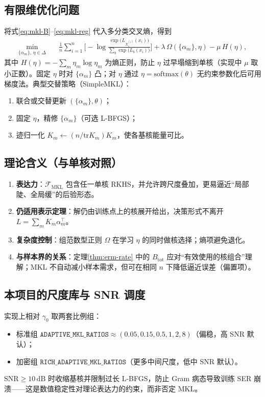 \subsection{有限维优化问题}
将式\eqref{eq:mkl-B}--\eqref{eq:mkl-reg} 代入多分类交叉熵，得到
\begin{equation}
\begin{aligned}
\min_{\{\alpha_m\},\,\eta\in\Delta}
&\quad
\frac1n\sum_{i=1}^n
\Big[
-\log\frac{\exp\big(L_{X_1^{(i)}}(x_i)\big)}{\sum_b\exp\big(L_b(x_i)\big)}
\Big]
+\lambda\,\Omega(\{\alpha_m\},\eta)
-\mu\,H(\eta),
\end{aligned}
\label{eq:mkl-obj}
\end{equation}
其中 $H(\eta)=-\sum_m\eta_m\log\eta_m$ 为熵正则，防止 $\eta$ 过早塌缩到单核（实现中 $\mu$ 取小正数）。固定 $\eta$ 时对 $\{\alpha_m\}$ 凸；对 $\eta$ 通过 $\eta=\mathrm{softmax}(\theta)$ 无约束参数化后可用梯度法。典型交替策略（SimpleMKL）：
\begin{enumerate}[leftmargin=2em]
  \item 联合或交替更新 $(\{\alpha_m\},\theta)$；
  \item 固定 $\eta$，精修 $\{\alpha_m\}$（可选 L-BFGS）；
  \item 迹归一化 $K_m\leftarrow (n/\mathrm{tr}K_m)K_m$，使各基核能量可比。
\end{enumerate}

\subsection{理论含义（与单核对照）}
\begin{enumerate}[leftmargin=2em]
  \item \textbf{表达力}：$\mathcal{F}_{\mathrm{MKL}}$ 包含任一单核 RKHS，并允许跨尺度叠加，更易逼近“局部陡、全局缓”的后验形态。
  \item \textbf{仍适用表示定理}：解仍由训练点上的核展开给出，决策形式不离开 $L=\sum_m K_m\alpha_m^\top$。
  \item \textbf{复杂度控制}：组范数型正则 $\Omega$ 在学习 $\eta$ 的同时做核选择；熵项避免退化。
  \item \textbf{与样本界的关系}：定理\ref{thm:erm-rate} 中的 $B_{\mathrm{tot}}$ 应对“有效使用的核组合”理解；MKL 不自动减小样本需求，但可在相同 $n$ 下降低逼近误差（偏置项）。
\end{enumerate}

\subsection{本项目的尺度库与 SNR 调度}
实现上相对 $\gamma_0$ 取两套比例组：
\begin{itemize}[leftmargin=2em]
  \item 标准组 $\texttt{ADAPTIVE\_MKL\_RATIOS}\approx(0.05,0.15,0.5,1,2,8)$（偏稳，高 SNR 默认）；
  \item 加密组 $\texttt{RICH\_ADAPTIVE\_MKL\_RATIOS}$（更多中间尺度，低中 SNR 默认）。
\end{itemize}
$\mathrm{SNR}\ge 10\,\mathrm{dB}$ 时收缩基核并限制过长 L-BFGS，防止 Gram 病态导致训练 SER 崩溃——这是数值稳定性对理论表达力的约束，而非否定 MKL。

